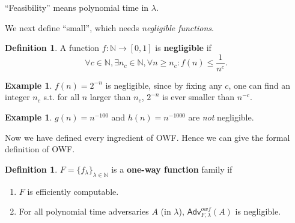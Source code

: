 \documentclass[12pt]{article}
\newcommand{\N}{\mathbb{N}}
\newcommand{\Adv}{\textsf{Adv}}
\theoremstyle{definition}
\newtheorem{definition}[theorem]{Definition}
\newtheorem{example}[theorem]{Example}
\begin{document}
``Feasibility'' means polynomial time in $\lambda$.

We next define ``small'', which needs \emph{negligible functions}.
\begin{definition}
A function $f : \N \to [0,1]$ is {\bf negligible} if
$$\forall c\in\N, \exists n_c\in\N, \forall n\geq n_c : f(n) \leq \frac{1}{n^c}.$$
\end{definition}

\begin{example}
$f(n) = 2^{-n}$ is negligible, since by fixing any $c$, one can find an integer $n_c$ s.t. for all $n$ larger than $n_c$, $2^{-n}$ is ever smaller than $n^{-c}$.
\end{example}

\begin{example}
$g(n) = n^{-100}$ and $h(n) = n^{-1000}$ are \emph{not} negligible.
\end{example}

Now we have defined every ingredient of OWF. Hence we can give the formal definition of OWF.
\begin{definition}
$F=\{f_\lambda\}_{\lambda\in\N}$ is a {\bf one-way function} family if
\begin{enumerate}
\item $F$ is efficiently computable.
\item For all polynomial time adversaries $A$ (in $\lambda$), $\Adv_{F,\lambda}^{owf}(A)$ is negligible.
\end{enumerate}
\end{definition}
\end{document}
